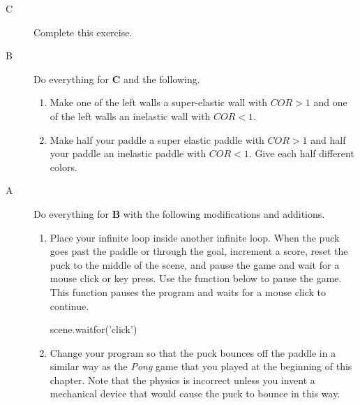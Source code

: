\pagebreak

\analysis

\begin{description}

\item[C] Complete this exercise.

\item[B] Do everything for {\bf C} and the following.

\begin{enumerate}
	\item Make one of the left walls a super-elastic wall with $COR>1$ and one of the left walls an inelastic wall with $COR<1$.
	\item Make half your paddle a super elastic paddle with $COR>1$ and half your paddle an inelastic paddle with $COR<1$. Give each half different colors.
\end{enumerate}

\item[A] Do everything for {\bf B} with the following modifications and additions.

\begin{enumerate}
	\item Place your infinite loop inside another infinite loop. When the puck goes past the paddle or through the goal, increment a score, reset the puck to the middle of the scene, and pause the game and wait for a mouse click or key press. Use the function below to pause the game. This function pauses the program and waits for a mouse click to continue.
	
\begin{myvpython}
scene.waitfor('click')
\end{myvpython}

	\item Change your program so that the puck bounces off the paddle in a similar way as the \emph{Pong} game that you played at the beginning of this chapter. Note that the physics is incorrect unless you invent a mechanical device that would cause the puck to bounce in this way.
	
\end{enumerate}




\end{description}

